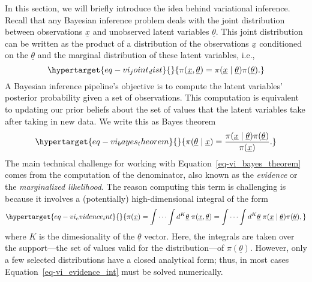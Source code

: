 \documentclass[
]{scrartcl}
\begin{document}
\begin{refsegment}
In this section, we will briefly introduce the idea behind variational
inference. Recall that any Bayesian inference problem deals with the
joint distribution between observations \(\underline{x}\) and unobserved
latent variables \(\underline{\theta}\). This joint distribution can be
written as the product of a distribution of the observations
\(\underline{x}\) conditioned on the \(\underline{\theta}\) and the
marginal distribution of these latent variables, i.e.,
\begin{equation}\protect\hypertarget{eq-vi_joint_dist}{}{
\pi(\underline{x}, \underline{\theta}) =
\pi(\underline{x} \mid \underline{\theta}) \pi(\underline{\theta}).
}\label{eq-vi_joint_dist}\end{equation} A Bayesian inference pipeline's
objective is to compute the latent variables' posterior probability
given a set of observations. This computation is equivalent to updating
our prior beliefs about the set of values that the latent variables take
after taking in new data. We write this as Bayes theorem
\begin{equation}\protect\hypertarget{eq-vi_bayes_theorem}{}{
\pi(\underline{\theta} \mid \underline{x}) = 
\frac{
        \pi(\underline{x} \mid \underline{\theta})\pi(\underline{\theta})
    }{
        \pi(\underline{x})
    }.
}\label{eq-vi_bayes_theorem}\end{equation} The main technical challenge
for working with Equation~\ref{eq-vi_bayes_theorem} comes from the
computation of the denominator, also known as the \emph{evidence} or the
\emph{marginalized likelihood}. The reason computing this term is
challenging is because it involves a (potentially) high-dimensional
integral of the form
\begin{equation}\protect\hypertarget{eq-vi_evidence_int}{}{
\pi(\underline{x}) = 
\int\cdots\int d^K\underline{\theta}\; \pi(\underline{x}, \underline{\theta}) = 
\int\cdots\int d^K\underline{\theta}\; 
\pi(\underline{x} \mid \underline{\theta})
\pi(\underline{\theta}),
}\label{eq-vi_evidence_int}\end{equation} where \(K\) is the
dimesionality of the \(\underline{\theta}\) vector. Here, the integrals
are taken over the support---the set of values valid for the
distribution---of \(\pi(\underline{\theta})\). However, only a few
selected distributions have a closed analytical form; thus, in most
cases Equation~\ref{eq-vi_evidence_int} must be solved numerically.


\end{refsegment}
\end{document}
